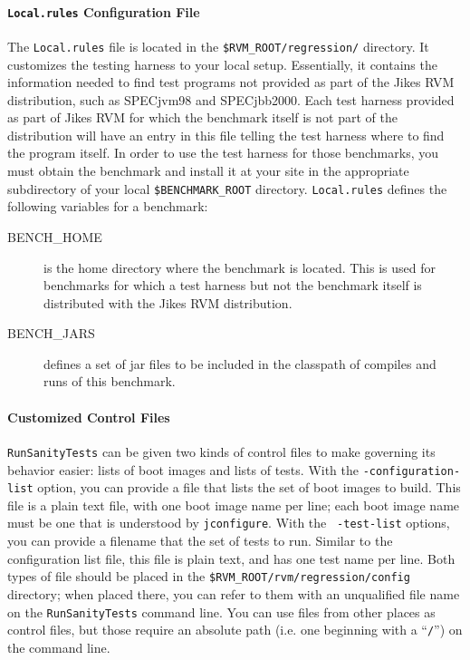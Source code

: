 \paragraph{\texttt{\textbf{Local.rules}} Configuration File}

The {\tt Local.rules} file is located in the 
{\tt \$RVM\_\-ROOT/\-re\-gres\-sion/} directory. 
It customizes the testing harness to your local
setup.  Essentially, it contains the information needed to find test
programs not provided as part of the Jikes RVM distribution, such as
SPECjvm\Rweb{}98 and SPECjbb\Rboth{}2000.  Each test harness
provided as part of Jikes RVM for which the benchmark itself is
not part of the distribution will have an entry in this file telling
the test harness where to find the program itself.  In order to use
the test harness for those benchmarks, you must obtain the benchmark
and install it at your site in the appropriate subdirectory of your
local {\tt \$BENCHMARK\_\-ROOT} directory. {\tt{Local.rules}} defines 
the following variables for a benchmark:
\begin{description}
\item[BENCH\_HOME] is the home directory where the benchmark is
located.  This is used for benchmarks for which a test harness but not
the benchmark itself is distributed with the Jikes RVM distribution. 
\item[BENCH\_JARS] defines a set of jar files to be included in the
classpath of compiles and runs of this benchmark.
\end{description}

\paragraph{Customized Control Files}

\texttt{RunSanityTests} can be given two kinds of control files to make
governing its behavior easier: lists of boot images and lists of
tests.  With the {\tt -con\-fi\-gu\-ra\-tion-list} option, you can provide a
file that lists the set of boot images to build.  This file is a plain
text file, with one boot image name per line; each boot image name
must be one that is understood by \texttt{jconfigure}.  With the {\tt
-test-list} options, you can provide a filename that the set of tests
to run.  Similar to the configuration list file, this file is plain
text, and has one test name per line.  Both types of file should be
placed in the {\tt \$RVM\_\-ROOT/rvm/regression/config} directory; when placed
there, you can refer to them with an unqualified file name on the
\texttt{RunSanityTests} command line.  You can use files from other places as
control files, but those require an absolute path (i.e. one beginning
with a ``{\tt /}'') on the command line.


